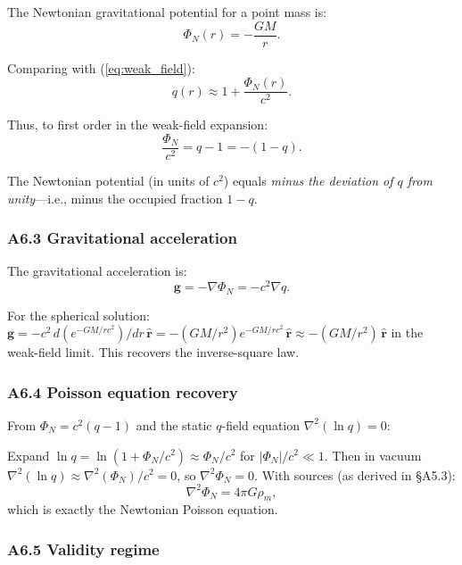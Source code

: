 \documentclass[reprint]{revtex4-2}
\begin{document}
The Newtonian gravitational potential for a point mass is:
\begin{equation}
\Phi_N(r) = -\frac{GM}{r}.
\end{equation}

Comparing with (\ref{eq:weak_field}):
\begin{equation}
q(r) \approx 1 + \frac{\Phi_N(r)}{c^2}.
\end{equation}

Thus, to first order in the weak-field expansion:
\begin{equation}
\boxed{\frac{\Phi_N}{c^2} = q - 1 = -(1-q)}.
\label{eq:newton_correspondence}
\end{equation}

The Newtonian potential (in units of $c^2$) equals \emph{minus the deviation of $q$ from unity}---i.e., minus the occupied fraction $1-q$.

\subsubsection{A6.3 Gravitational acceleration}

The gravitational acceleration is:
\begin{equation}
\mathbf{g} = -\nabla\Phi_N = -c^2\nabla q.
\end{equation}

For the spherical solution: $\mathbf{g} = -c^2\,d(e^{-GM/rc^2})/dr\,\hat{\mathbf{r}} = -(GM/r^2)e^{-GM/rc^2}\,\hat{\mathbf{r}} \approx -(GM/r^2)\,\hat{\mathbf{r}}$ in the weak-field limit. This recovers the inverse-square law.

\subsubsection{A6.4 Poisson equation recovery}

From $\Phi_N = c^2(q-1)$ and the static $q$-field equation $\nabla^2(\ln q)=0$:

Expand $\ln q = \ln(1 + \Phi_N/c^2) \approx \Phi_N/c^2$ for $|\Phi_N|/c^2 \ll 1$. Then in vacuum $\nabla^2(\ln q) \approx \nabla^2(\Phi_N)/c^2 = 0$, so $\nabla^2\Phi_N=0$. With sources (as derived in \S A5.3):
\begin{equation}
\nabla^2\Phi_N = 4\pi G\rho_m,
\end{equation}
which is exactly the Newtonian Poisson equation.

\subsubsection{A6.5 Validity regime}
\end{document}
